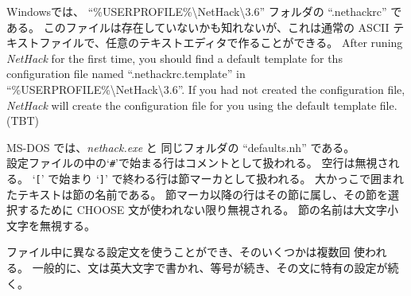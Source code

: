 Windowsでは、
\mbox{{``\%USERPROFILE\%\textbackslash NetHack\textbackslash 3.6''}} フォルダの
\mbox{``.nethackrc''} である。
このファイルは存在していないかも知れないが、これは通常の
ASCII テキストファイルで、任意のテキストエディタで作ることができる。
After runing {\it NetHack\/} for the first time, you should find a default
template for ths configuration file named \mbox{``.nethackrc.template''} in
\mbox{{``\%USERPROFILE\%\textbackslash NetHack\textbackslash 3.6''}}.
If you had not created the configuration file, {\it NetHack\/} will create
the configuration file for you using the default template file.
(TBT)

MS-DOS では、\mbox{{\it nethack.exe\/}} と
同じフォルダの \mbox{``defaults.nh''} である。\\

設定ファイルの中の`{\tt \#}'で始まる行はコメントとして扱われる。
空行は無視される。
`{\tt [}' で始まり `{\tt ]}' で終わる行は節マーカとして扱われる。
大かっこで囲まれたテキストは節の名前である。
節マーカ以降の行はその節に属し、その節を選択するために
CHOOSE 文が使われない限り無視される。
節の名前は大文字小文字を無視する。

ファイル中に異なる設定文を使うことができ、そのいくつかは複数回
使われる。
一般的に、文は英大文字で書かれ、等号が続き、その文に特有の設定が続く。

